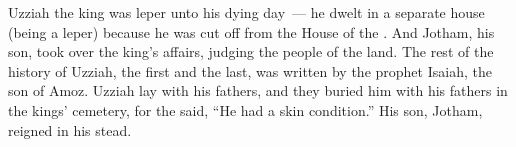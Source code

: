 \begin{inparaenum}
   Uzziah the king was leper unto his dying day~--- he dwelt in a separate house (being a leper) because he was cut off from the House of the \lord. And Jotham, his son, took over the king's affairs, judging the people of the land.%
   The rest of the history of Uzziah, the first and the last, was written by the prophet Isaiah, the son of Amoz.%
   Uzziah lay with his fathers, and they buried him with his fathers in the kings' cemetery, for the said, ``He had a skin condition.'' His son, Jotham, reigned in his stead.%
\end{inparaenum}
